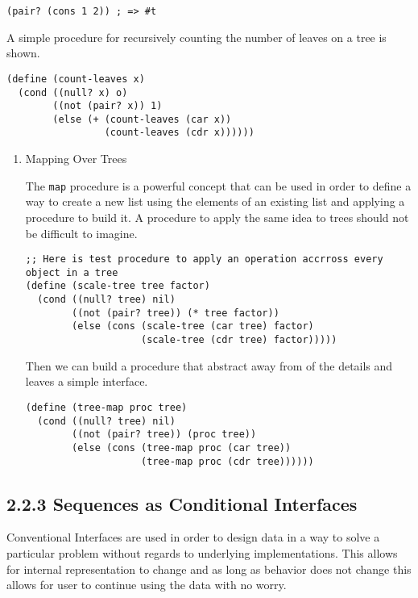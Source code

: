 \documentclass[11pt]{article}
\begin{document}
\begin{verbatim}
(pair? (cons 1 2)) ; => #t
\end{verbatim}

A simple procedure for recursively counting the number of leaves on a
tree is shown.

\begin{verbatim}
(define (count-leaves x)
  (cond ((null? x) o)
        ((not (pair? x)) 1)
        (else (+ (count-leaves (car x))
                 (count-leaves (cdr x))))))
\end{verbatim}

\begin{enumerate}
\item Mapping Over Trees
\label{sec:org7887762}

The \texttt{map} procedure is a powerful concept that can be used in order to
define a way to create a new list using the elements of an existing list
and applying a procedure to build it. A procedure to apply the same idea
to trees should not be difficult to imagine.

\begin{verbatim}
;; Here is test procedure to apply an operation accrross every object in a tree
(define (scale-tree tree factor)
  (cond ((null? tree) nil)
        ((not (pair? tree)) (* tree factor))
        (else (cons (scale-tree (car tree) factor)
                    (scale-tree (cdr tree) factor)))))
\end{verbatim}

Then we can build a procedure that abstract away from of the details and
leaves a simple interface.

\begin{verbatim}
(define (tree-map proc tree)
  (cond ((null? tree) nil)
        ((not (pair? tree)) (proc tree))
        (else (cons (tree-map proc (car tree))
                    (tree-map proc (cdr tree))))))
\end{verbatim}
\end{enumerate}

\subsection{2.2.3 Sequences as Conditional Interfaces}
\label{sec:orgd9ca817}
Conventional Interfaces are used in order to design data in a way to
solve a particular problem without regards to underlying
implementations. This allows for internal representation to change and
as long as behavior does not change this allows for user to continue
using the data with no worry.
\end{document}
